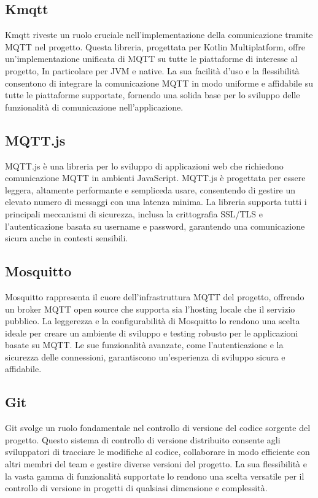 \documentclass[12pt,a4paper,openright,twoside]{book}
\begin{document}
\subsection{Kmqtt}
Kmqtt riveste un ruolo cruciale nell'implementazione della comunicazione tramite \ac{MQTT} nel progetto. Questa libreria, progettata per Kotlin Multiplatform, offre 
un'implementazione unificata di \ac{MQTT} su tutte le piattaforme di interesse al progetto, In particolare per \ac{JVM} e native. La sua facilità d'uso e la flessibilità consentono di integrare la comunicazione 
\ac{MQTT} in modo uniforme e affidabile su tutte le piattaforme supportate, fornendo una solida base per lo sviluppo delle funzionalità di comunicazione nell'applicazione.

\subsection{MQTT.js}
MQTT.js è una libreria per lo sviluppo di applicazioni web che richiedono comunicazione \ac{MQTT} in ambienti JavaScript. 
MQTT.js è progettata per essere leggera, altamente performante e sempliceda usare, consentendo di gestire un elevato numero di messaggi con una latenza minima. 
La libreria supporta tutti i principali meccanismi di sicurezza, inclusa la crittografia SSL/TLS e l'autenticazione basata su username e password, garantendo una comunicazione 
sicura anche in contesti sensibili.

\subsection{Mosquitto}

Mosquitto rappresenta il cuore dell'infrastruttura \ac{MQTT} del progetto, offrendo un broker \ac{MQTT} open source che supporta sia l'hosting locale che il servizio pubblico. 
La leggerezza e la configurabilità di Mosquitto lo rendono una scelta ideale per creare un ambiente di sviluppo e testing robusto per le applicazioni basate su \ac{MQTT}. 
Le sue funzionalità avanzate, come l'autenticazione e la sicurezza delle connessioni, garantiscono un'esperienza di sviluppo sicura e affidabile.

\subsection{Git}
Git svolge un ruolo fondamentale nel controllo di versione del codice sorgente del progetto. Questo sistema di controllo di versione distribuito consente agli sviluppatori 
di tracciare le modifiche al codice, collaborare in modo efficiente con altri membri del team e gestire diverse versioni del progetto. La sua flessibilità e la vasta gamma 
di funzionalità supportate lo rendono una scelta versatile per il controllo di versione in progetti di qualsiasi dimensione e complessità.
\end{document}
